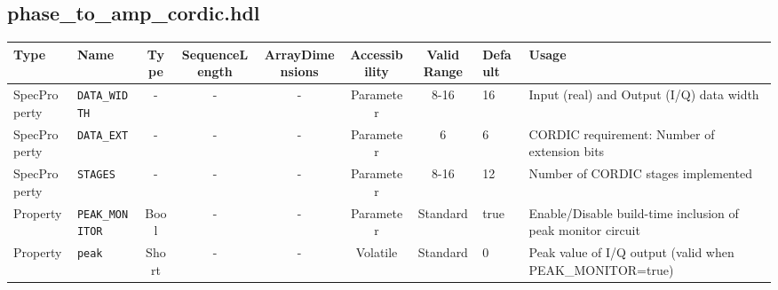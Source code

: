 \documentclass{article}
\def\comp{phase\_to\_amp\_cordic}
\begin{document}
\begin{landscape}
\subsection*{\comp.hdl}
\begin{scriptsize}
	\begin{tabular}{|p{3cm}|p{2cm}|c|c|c|c|c|p{1cm}|p{6cm}|}
		\hline
		\rowcolor{blue}
		Type         & Name              & Type & SequenceLength & ArrayDimensions & Accessibility & Valid Range & Default & Usage                                    \\
		\hline
		SpecProperty & \verb+DATA_WIDTH+ & -    & -              & -               & Parameter     & 8-16        & 16      & Input (real) and Output (I/Q) data width \\
		\hline
		SpecProperty & \verb+DATA_EXT+   & -    & -              & -               & Parameter     & 6           & 6       & CORDIC requirement: Number of extension bits \\
		\hline
		SpecProperty & \verb+STAGES+     & -    & -              & -               & Parameter     & 8-16        & 12      & Number of CORDIC stages implemented      \\
		\hline
		Property & \verb+PEAK_MONITOR+     & Bool    & -              & -               & Parameter     & Standard        & true      & Enable/Disable build-time inclusion of peak monitor circuit\\
		\hline
		Property & \verb+peak+     & Short & -              & -               & Volatile & Standard        & 0 & Peak value of I/Q output (valid when PEAK\_MONITOR=true)\\
		\hline
	\end{tabular}
\end{scriptsize}

\end{landscape}
\end{document}
